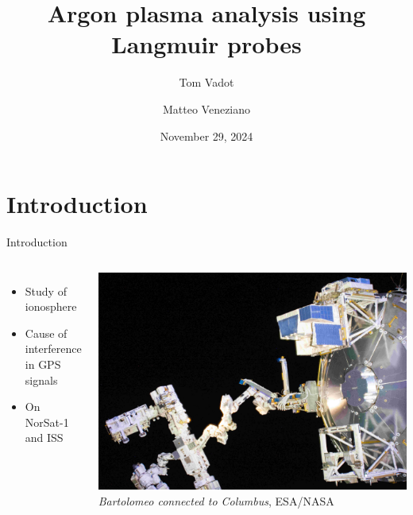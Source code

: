 \documentclass[10pt]{beamer}
\title{Argon plasma analysis using Langmuir probes}
\author{Tom Vadot \and Matteo Veneziano}
\institute{EPFL Section of Physics}
\date{November 29, 2024}
\begin{document}
\begin{frame}
    \titlepage
\end{frame}

\section{Introduction}

\begin{frame}[t]{Introduction}
    \begin{columns}
        \begin{itemize}
            \item Study of ionosphere
            \item Cause of interference in GPS signals \, 
            \item On NorSat-1 \,  and ISS \, 
        \end{itemize}

        \centering
        \includegraphics[width=\textwidth]{../figures/bartolomeo.jpg}
        \small{\emph{Bartolomeo connected to Columbus}, ESA/NASA}
    \end{columns}
\end{frame}
\end{document}
